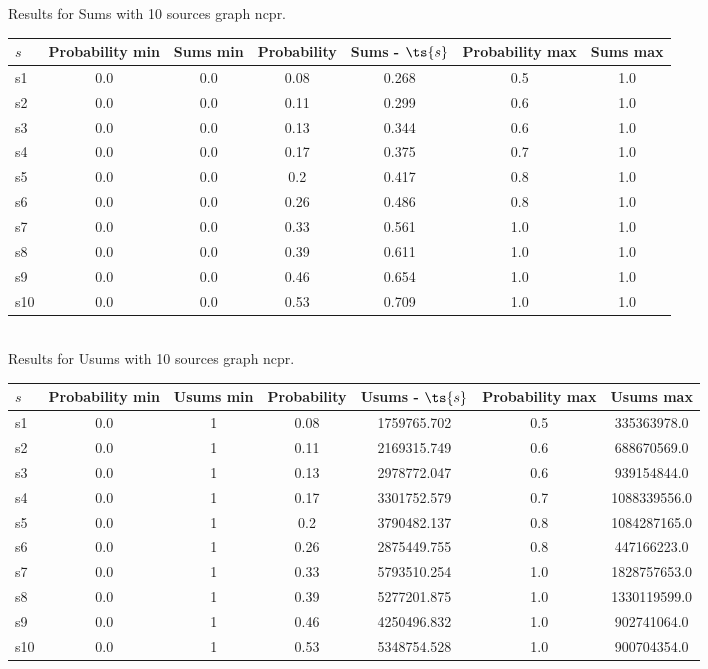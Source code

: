 \documentclass{article}
\begin{document}
\noindent Results for Sums with 10 sources graph ncpr.

\noindent\begin{tabular}{|l|c|c|c|c|c|c|}
\hline
$s$& Probability min & Sums min & Probability & Sums - $\ts{s}$ & Probability max & Sums max\\
\hline
s1 &0.0 & 0.0 & 0.08 & 0.268 & 0.5 & 1.0\\
\hline
s2 &0.0 & 0.0 & 0.11 & 0.299 & 0.6 & 1.0\\
\hline
s3 &0.0 & 0.0 & 0.13 & 0.344 & 0.6 & 1.0\\
\hline
s4 &0.0 & 0.0 & 0.17 & 0.375 & 0.7 & 1.0\\
\hline
s5 &0.0 & 0.0 & 0.2 & 0.417 & 0.8 & 1.0\\
\hline
s6 &0.0 & 0.0 & 0.26 & 0.486 & 0.8 & 1.0\\
\hline
s7 &0.0 & 0.0 & 0.33 & 0.561 & 1.0 & 1.0\\
\hline
s8 &0.0 & 0.0 & 0.39 & 0.611 & 1.0 & 1.0\\
\hline
s9 &0.0 & 0.0 & 0.46 & 0.654 & 1.0 & 1.0\\
\hline
s10 &0.0 & 0.0 & 0.53 & 0.709 & 1.0 & 1.0\\
\hline
\end{tabular}\\

\noindent Results for Usums with 10 sources graph ncpr.

\noindent\begin{tabular}{|l|c|c|c|c|c|c|}
\hline
$s$& Probability min & Usums min & Probability & Usums - $\ts{s}$ & Probability max & Usums max\\
\hline
s1 &0.0 & 1 & 0.08 & 1759765.702 & 0.5 & 335363978.0\\
\hline
s2 &0.0 & 1 & 0.11 & 2169315.749 & 0.6 & 688670569.0\\
\hline
s3 &0.0 & 1 & 0.13 & 2978772.047 & 0.6 & 939154844.0\\
\hline
s4 &0.0 & 1 & 0.17 & 3301752.579 & 0.7 & 1088339556.0\\
\hline
s5 &0.0 & 1 & 0.2 & 3790482.137 & 0.8 & 1084287165.0\\
\hline
s6 &0.0 & 1 & 0.26 & 2875449.755 & 0.8 & 447166223.0\\
\hline
s7 &0.0 & 1 & 0.33 & 5793510.254 & 1.0 & 1828757653.0\\
\hline
s8 &0.0 & 1 & 0.39 & 5277201.875 & 1.0 & 1330119599.0\\
\hline
s9 &0.0 & 1 & 0.46 & 4250496.832 & 1.0 & 902741064.0\\
\hline
s10 &0.0 & 1 & 0.53 & 5348754.528 & 1.0 & 900704354.0\\
\hline
\end{tabular}\\
\end{document}

